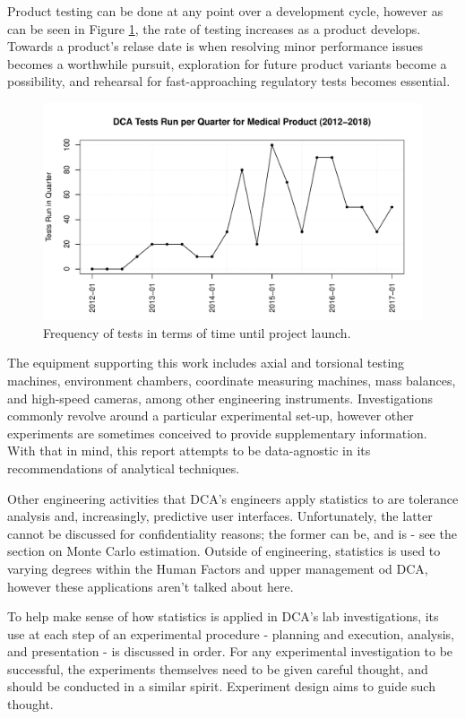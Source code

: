\documentclass[11pt,a4paper,article]{memoir} %
\begin{document}
\par
Product testing can be done at any point over a development cycle, however as can be seen in Figure \ref{fig:tests_per_quarter}, the rate of testing increases as a product develops. Towards a product's relase date is when resolving minor performance issues becomes a worthwhile pursuit, exploration for future product variants become a possibility, and rehearsal for fast-approaching regulatory tests becomes essential.
\begin{figure}
\includegraphics[width=\textwidth]{tests_per_quarter.pdf}
\caption{Frequency of tests in terms of time until project launch.}
\label{fig:tests_per_quarter}
\end{figure}
\par
The equipment supporting this work includes axial and torsional testing machines, environment chambers, coordinate measuring machines, mass balances, and high-speed cameras, among other engineering instruments. Investigations commonly revolve around a particular experimental set-up, however other experiments are sometimes conceived to provide supplementary information. With that in mind, this report attempts to be data-agnostic in its recommendations of analytical techniques.
\par
Other engineering activities that DCA's engineers apply statistics to are tolerance analysis and, increasingly, predictive user interfaces. Unfortunately, the latter cannot be discussed for confidentiality reasons; the former can be, and is - see the section on Monte Carlo estimation. Outside of engineering, statistics is used to varying degrees within the Human Factors and upper management od DCA, however these applications aren't talked about here.
\par
To help make sense of how statistics is applied in DCA's lab investigations, its use at each step of an experimental procedure - planning and execution, analysis, and presentation - is discussed in order. For any experimental investigation to be successful, the experiments themselves need to be given careful thought, and should be conducted in a similar spirit. Experiment design aims to guide such thought.
\end{document}
